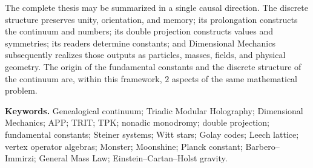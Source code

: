 The complete thesis may be summarized in a single causal direction. The discrete
structure preserves unity, orientation, and memory; its prolongation
constructs the continuum and numbers; its double projection constructs values and
symmetries; its readers determine constants; and Dimensional Mechanics subsequently realizes
those outputs as particles, masses, fields, and physical geometry. The origin of
the fundamental constants and the discrete structure of the continuum are, within
this framework, \(2\) aspects of the same mathematical problem.

\medskip
\noindent\textbf{Keywords.}
Genealogical continuum; Triadic Modular Holography; Dimensional Mechanics;
APP; TRIT; TPK; nonadic monodromy; double projection; fundamental
constants; Steiner systems; Witt stars; Golay codes; Leech lattice;
vertex operator algebras; Monster; Moonshine; Planck constant;
Barbero--Immirzi; General Mass Law; Einstein--Cartan--Holst gravity.

\ifdefined\HMTTeoremaGeneradorFrontalCargado
\else
  \clearpage
  
\fi
